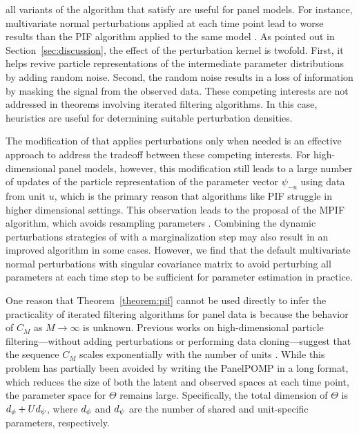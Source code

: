 \documentclass[12pt]{article}\usepackage[]{graphicx}\usepackage[]{xcolor}
\begin{document}
\begin{appendices}
    all variants of the algorithm that satisfy   are useful for panel models.
    For instance, multivariate normal perturbations applied  at each time point  lead to worse results than the PIF algorithm applied to the same model \citep{breto20}.
    As pointed out in Section~\ref{sec:discussion}, the effect of the perturbation kernel is twofold.
    First, it helps revive particle representations of the intermediate parameter distributions by adding random noise.
    Second, the random noise results in a loss of information by masking the signal from the observed data.
    These competing interests are not addressed in theorems involving iterated filtering algorithms.
    In this case, heuristics are useful for determining suitable perturbation densities.

    The modification of \citet{chen25} that applies perturbations only when needed is an effective approach to address the tradeoff between these competing interests.
    For high-dimensional panel models, however, this modification still leads to a large number of updates of the particle representation of the parameter vector $\psi_{-u}$ using data from unit $u$, which is the primary reason that algorithms like PIF struggle in higher dimensional settings.
    This observation leads to the proposal of the MPIF algorithm, which avoids resampling parameters  \new{\firsttypo}.
 Combining the dynamic perturbations strategies of \citet{chen25} with a marginalization step may also result in an improved algorithm in some cases.
 However, we find that the default multivariate normal perturbations with singular covariance matrix to avoid perturbing all parameters at each time step to be sufficient for parameter estimation in practice.

One reason that Theorem~\ref{theorem:pif} cannot be used directly to infer the practicality of iterated filtering algorithms for panel data is because the behavior of $C_M$ as $M \rightarrow \infty$ is unknown.
Previous works on high-dimensional particle filtering---without adding perturbations or performing data cloning---suggest that the sequence $C_M$ scales exponentially with the number of units \citep{snyder08,bengtsson08}.
While this problem has partially been avoided by writing the PanelPOMP in a long format, which reduces the size of both the latent and observed spaces at each time point, the parameter space for $\Theta$ remains large.
Specifically, the total dimension of $\Theta$ is $d_\phi + Ud_\psi$, where $d_\phi$ and $d_\psi$ are the number of shared and unit-specific parameters, respectively.


\end{appendices}
\end{document}
